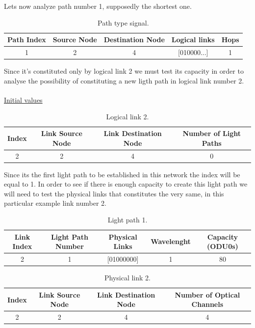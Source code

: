 Lets now analyze path number 1, supposedly the shortest one.\\

\begin{table}[H]
	\centering
	\begin{tabular}{|c|c|c|c|c|}
		\hline
		Path Index & Source Node & Destination Node & Logical links & Hops\\ \hline
		1& 2       & 4  & [010000...]  &  1  \\ \hline
	\end{tabular}
	\caption{Path type signal.}
	\label{path_signal}
\end{table}

Since it's constituted only by logical link 2 we must test its capacity in order to analyse the possibility of constituting a new ligth path in logical link number 2.	\\
\\
\underline{Initial values}\\
\begin{table}[H]
	\centering
	\begin{tabular}{|c|c|c|c|}
		\hline
		Index & Link Source Node & Link Destination Node & Number of Light Paths \\ \hline
		2     & 2           & 4                 & 0                \\  \hline
	\end{tabular}
	\caption{Logical link 2.}
	\label{logicalLink_variable}
\end{table}

Since its the first light path to be established in this network the index will be equal to 1. In order to see if there is enough capacity to create this light path we will need to test the physical links that constitutes the very same, in this particular example link number 2.\\

\begin{table}[H]
	\centering
	\begin{tabular}{|c|c|c|c|c|}
		\hline
		Link Index & Light Path Number & Physical Links  & Wavelenght & Capacity (ODU0s) \\ \hline
		2          & 1                 & {[}01000000{]} & 1 & 80    \\ 	\hline
	\end{tabular}
	\caption{Light path 1.}
	\label{lightpath_example}
\end{table}
\begin{table}[H]
		\centering
		\begin{tabular}{|c|c|c|c|}
		\hline
		Index & Link Source Node & Link Destination Node & Number of Optical Channels \\ \hline
		2     & 2            & 4                 & 4                        \\ \hline
		\end{tabular}
	\caption{Physical link 2.}
	\label{link_example}
\end{table}

